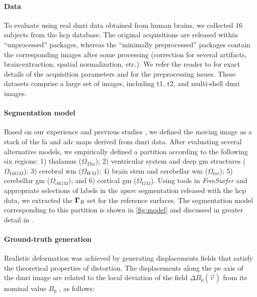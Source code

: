 \paragraph*{Data}
To evaluate \regseg{} using real \gls*{dmri} data obtained from human brains,
  we collected 16 subjects from the \gls*{hcp} database.
The original acquisitions are released within ``unprocessed'' packages, whereas
  the ``minimally preprocessed'' packages contain the corresponding images after
  some processing (correction for several artifacts, brain-extraction, spatial
  normalization, etc.).
We refer the reader to \citep{essen_human_2012} for exact details of the acquisition
  parameters and \citep{glasser_minimal_2013} for the preprocessing issues.
These datasets comprise a large set of images, including \gls*{t1}, \gls*{t2}, and
  multi-shell \gls*{dmri} images.

\paragraph*{Segmentation model}
Based on our experience %
  and previous studies \citep{ennis_orthogonal_2006},
  we defined the moving image as a stack of the \gls*{fa} and \gls*{adc} maps derived
  from \gls*{dmri} data.
After evaluating several alternative models, we empirically defined a partition \omegaset{}
  according to the following six regions:
  1) thalamus ($\Omega_{Tha}$);
  2) ventricular system and deep \gls*{gm} structures ($\Omega_{VdGM}$);
  3) cerebral \gls*{wm} ($\Omega_{WM}$);
  4) brain stem and cerebellar \gls*{wm} ($\Omega_{bst}$);
  5) cerebellar \gls*{gm} ($\Omega_{cbGM}$); and
  6) cortical \gls*{gm} ($\Omega_{GM}$).
Using tools in \emph{FreeSurfer} and appropriate selections of labels in the
  \emph{aparc} segmentation released with the \gls*{hcp} data, we extracted the $\boldsymbol{\Gamma}_R$ set for the
  reference surfaces.
The segmentation model corresponding to this partition is shown in \autoref{fig:model}
  and discussed in greater detail in .

\paragraph*{Ground-truth generation}
Realistic deformation was achieved by generating displacements fields that satisfy the theoretical
  properties of distortion.
The displacements along the \gls*{pe} axis of the \gls*{dmri} image are related to the local
  deviation of the field $\Delta B_0(\vec{r})$ from its nominal value $B_0$  \citep{jezzard_correction_1995},
  as follows:

